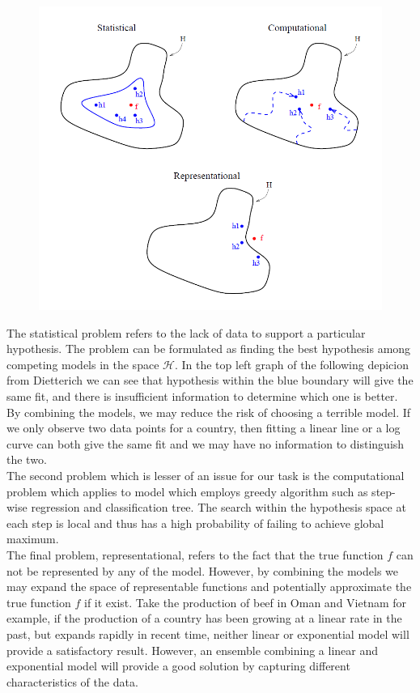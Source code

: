\documentclass[nojss]{jss}\usepackage[]{graphicx}\usepackage[]{color}
\begin{document}
\begin{figure}[!ht]
  \centering
  \includegraphics[scale = 0.7]{dietterich.png}
\end{figure}


The statistical problem refers to the lack of data to support a
particular hypothesis. The problem can be formulated as finding the
best hypothesis among competing models in the space
$\mathbf{\mathcal{H}}$. In the top left graph of the following
depicion from Dietterich we can see that hypothesis within the blue
boundary will give the same fit, and there is insufficient information
to determine which one is better. By combining the models, we may
reduce the risk of choosing a terrible model. If we only observe two
data points for a country, then fitting a linear line or a log curve
can both give the same fit and we may have no information to
distinguish the two.\\

The second problem which is lesser of an issue for our task is the
computational problem which applies to model which employs greedy
algorithm such as step-wise regression and classification tree. The
search within the hypothesis space at each step is local and thus has
a high probability of failing to achieve global maximum.\\

The final problem, representational, refers to the fact that the true
function $f$ can not be represented by any of the model. However, by
combining the models we may expand the space of representable
functions and potentially approximate the true function $f$ if it
exist. Take the production of beef in Oman and Vietnam for example, if
the production of a country has been growing at a linear rate in the
past, but expands rapidly in recent time, neither linear or
exponential model will provide a satisfactory result. However, an
ensemble combining a linear and exponential model will provide a good
solution by capturing different characteristics of the data.\\
\end{document}
